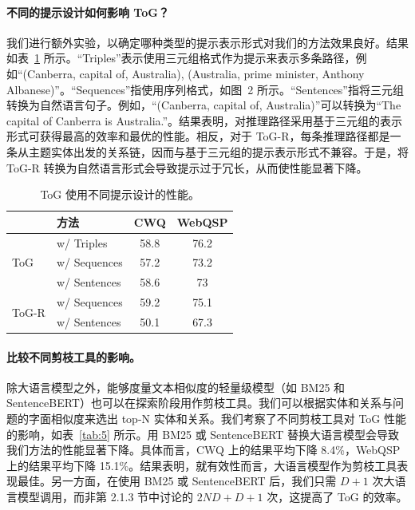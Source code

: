 \documentclass[11pt,UTF8,fontset=fandol]{ctexart}
\begin{document}
\paragraph{不同的提示设计如何影响 ToG？}
我们进行额外实验，以确定哪种类型的提示表示形式对我们的方法效果良好。结果如表~\ref{tab:4} 所示。“Triples”表示使用三元组格式作为提示来表示多条路径，例如“(Canberra, capital of, Australia), (Australia, prime minister, Anthony Albanese)”。“Sequences”指使用序列格式，如图~2 所示。“Sentences”指将三元组转换为自然语言句子。例如，“(Canberra, capital of, Australia)”可以转换为“The capital of Canberra is Australia.”。结果表明，对推理路径采用基于三元组的表示形式可获得最高的效率和最优的性能。相反，对于 ToG-R，每条推理路径都是一条从主题实体出发的关系链，因而与基于三元组的提示表示形式不兼容。于是，将 ToG-R 转换为自然语言形式会导致提示过于冗长，从而使性能显著下降。

\begin{table}[H]\centering
\caption{ToG 使用不同提示设计的性能。}
\label{tab:4}
\small
\begin{tabular}{llcc}
\toprule
& 方法 & CWQ & WebQSP \\
\midrule
\multirow{3}{*}{ToG} & w/ Triples & 58.8 & 76.2 \\
& w/ Sequences & 57.2 & 73.2 \\
& w/ Sentences & 58.6 & 73 \\
\midrule
\multirow{2}{*}{ToG-R} & w/ Sequences & 59.2 & 75.1 \\
& w/ Sentences & 50.1 & 67.3 \\
\bottomrule
\end{tabular}
\end{table}

\paragraph{比较不同剪枝工具的影响。}
除大语言模型之外，能够度量文本相似度的轻量级模型（如 BM25 和 SentenceBERT）也可以在探索阶段用作剪枝工具。我们可以根据实体和关系与问题的字面相似度来选出 top-N 实体和关系。我们考察了不同剪枝工具对 ToG 性能的影响，如表~\ref{tab:5} 所示。用 BM25 或 SentenceBERT 替换大语言模型会导致我们方法的性能显著下降。具体而言，CWQ 上的结果平均下降 8.4\%，WebQSP 上的结果平均下降 15.1\%。结果表明，就有效性而言，大语言模型作为剪枝工具表现最佳。另一方面，在使用 BM25 或 SentenceBERT 后，我们只需 $D + 1$ 次大语言模型调用，而非第 2.1.3 节中讨论的 $2ND + D + 1$ 次，这提高了 ToG 的效率。
\end{document}
